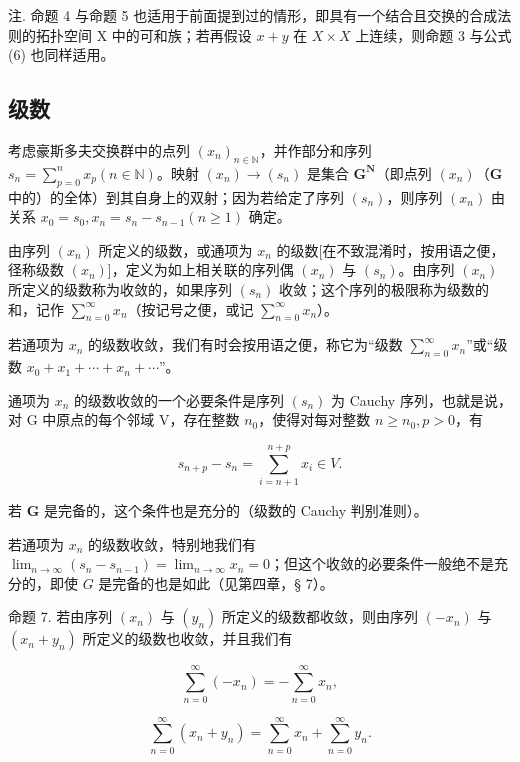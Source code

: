 注. 命题 4 与命题 5 也适用于前面提到过的情形，即具有一个结合且交换的合成法则的拓扑空间 X 中的可和族；若再假设 \(x + y\) 在 \(X \times X\) 上连续，则命题 3 与公式 (6) 也同样适用。

\subsection{级数}

考虑豪斯多夫交换群中的点列 \((x_{n})_{n\in \mathbb{N}}\)，并作部分和序列 \(s_n = \sum_{p=0}^{n} x_p (n \in \mathbb{N})\)。映射 \((x_{n}) \to (s_{n})\) 是集合 \(\mathbf{G}^{\mathbf{N}}\)（即点列 \((x_{n})\)（\(\mathbf{G}\) 中的）的全体）到其自身上的双射；因为若给定了序列 \((s_{n})\)，则序列 \((x_{n})\) 由关系 \(x_{0} = s_{0}, x_{n} = s_{n}-s_{n-1} (n \geqslant 1)\) 确定。

由序列 \((x_{n})\) 所定义的级数，或通项为 \(x_{n}\) 的级数{[}在不致混淆时，按用语之便，径称级数 \((x_{n})\){]}，定义为如上相关联的序列偶 \((x_{n})\) 与 \((s_{n})\)。由序列 \((x_{n})\) 所定义的级数称为收敛的，如果序列 \((s_n)\) 收敛；这个序列的极限称为级数的和，记作 \(\sum_{n=0}^{\infty} x_n\)（按记号之便，或记 \(\sum_{n=0}^{\infty} x_n\)）。

若通项为 \(x_{n}\) 的级数收敛，我们有时会按用语之便，称它为“级数 \(\sum_{n=0}^{\infty} x_{n}\)”或“级数 \(x_{0} + x_{1} + \cdots + x_{n} + \cdots\)”。

通项为 \(x_{n}\) 的级数收敛的一个必要条件是序列 \((s_{n})\) 为 Cauchy 序列，也就是说，对 G 中原点的每个邻域 V，存在整数 \(n_{0}\)，使得对每对整数 \(n \geqslant n_{0}, p > 0\)，有

\[
s _ {n + p} - s _ {n} = \sum_ {i = n + 1} ^ {n + p} x _ {i} \in V.
\]

若 \(\mathbf{G}\) 是完备的，这个条件也是充分的（级数的 Cauchy 判别准则）。

若通项为 \(x_{n}\) 的级数收敛，特别地我们有 \(\lim_{n\to \infty}(s_n - s_{n-1}) = \lim_{n\to \infty}x_n = 0\)；但这个收敛的必要条件一般绝不是充分的，即使 \(G\) 是完备的也是如此（见第四章，§ 7）。

命题 7. 若由序列 \((x_{n})\) 与 \((y_{n})\) 所定义的级数都收敛，则由序列 \((-x_{n})\) 与 \((x_{n} + y_{n})\) 所定义的级数也收敛，并且我们有

\[
\sum_ {n = 0} ^ {\infty} (- x _ {n}) = - \sum_ {n = 0} ^ {\infty} x _ {n},\tag{7}
\]

\[
\sum_ {n = 0} ^ {\infty} \left(x _ {n} + y _ {n}\right) = \sum_ {n = 0} ^ {\infty} x _ {n} + \sum_ {n = 0} ^ {\infty} y _ {n}.\tag{8}
\]

